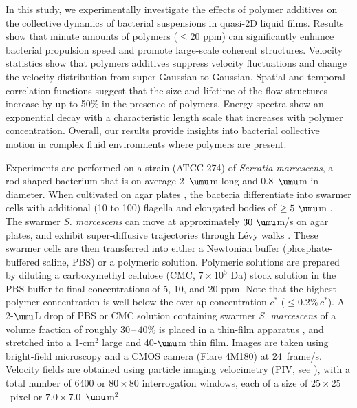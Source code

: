 \documentclass[aps,prl,floatfix,footinbib,twocolumn,superscriptaddress]{revtex4-1}
\begin{document}
In this study, we experimentally investigate the effects of polymer additives on the collective dynamics of bacterial suspensions in quasi-2D liquid films. Results show that minute amounts of polymers ($\le20$ ppm) can significantly enhance bacterial propulsion speed and promote large-scale coherent structures. Velocity statistics show that polymers additives suppress velocity fluctuations and change the velocity distribution from super-Gaussian to Gaussian. Spatial and temporal correlation functions suggest that the size and lifetime of the flow structures increase by up to 50\% in the presence of polymers. Energy spectra show an exponential decay with a characteristic length scale that increases with polymer concentration. Overall, our results provide insights into bacterial collective motion in complex fluid environments where polymers are present.

Experiments are performed on a strain (ATCC 274) of \textit{Serratia marcescens}, a rod-shaped bacterium that is on average 2~$\umu$m long and 0.8~$\umu$m in diameter. When cultivated on agar plates \cite{Supp_Mat}, the bacteria differentiate into swarmer cells with additional (10 to 100) flagella and elongated bodies of $\ge5~\umu$m \cite{Harshey_JBac_1990}. The swarmer \textit{S. marcescens} can move at approximately $30~\umu$m/s on agar plates, and exhibit super-diffusive trajectories through L\'evy walks \cite{Ariel_NC_2015}. These swarmer cells are then transferred into either a Newtonian buffer (phosphate-buffered saline, PBS) or a polymeric solution. Polymeric solutions are prepared by diluting a carboxymethyl cellulose (CMC, $7\times10^5$ Da) stock solution in the PBS buffer to final concentrations of 5, 10, and 20 ppm. Note that the highest polymer concentration is well below the overlap concentration $c^*$ ($\le0.2\%\,c^*$). A 2-$\umu$L drop of PBS or CMC solution containing swarmer \textit{S. marcescens} of a volume fraction of roughly $30\,\textrm{--}\,40$\% is placed in a thin-film apparatus \cite{Patteson2015, Qin2015, Supp_Mat}, and stretched into a 1-cm${}^2$ large and 40-$\umu$m thin film. Images are taken using bright-field microscopy and a CMOS camera (Flare 4M180) at 24~frame/s. Velocity fields are obtained using particle imaging velocimetry (PIV, see \cite{Gagnon_PRL_2020}), with a total number of 6400 or $80\times80$ interrogation windows, each of a size of $25\times25$~pixel or $7.0\times7.0$~$\umu$m${}^2$.
\end{document}
